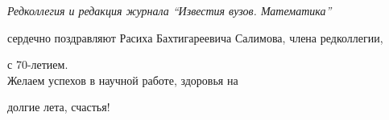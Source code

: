 


\newcommand{\tl}[3]{\medskip\noindent{\bf#1}\ #2 \dotfill #3 \par} 

\pagestyle{empty}





\phantom{a}

\bigskip



\bigskip



\bigskip



\bigskip



\bigskip



\vspace{5cm}



\begin{center}



{\it Редколлегия и редакция журнала ``Известия вузов. Математика''

сердечно поздравляют Расиха Бахтигареевича Салимова, члена редколлегии,

с 70-летием.\\ Желаем успехов в научной работе, здоровья на

долгие лета, счастья!}



\end{center}






